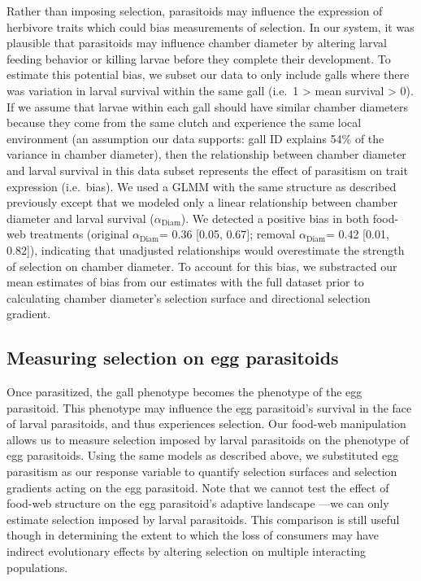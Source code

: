 \documentclass[11pt,]{article}
\begin{document}
Rather than imposing selection, parasitoids may influence the expression
of herbivore traits which could bias measurements of selection. In our
system, it was plausible that parasitoids may influence chamber diameter
by altering larval feeding behavior or killing larvae before they
complete their development. To estimate this potential bias, we subset
our data to only include galls where there was variation in larval
survival within the same gall (i.e.~1 \textgreater{} mean survival
\textgreater{} 0). If we assume that larvae within each gall should have
similar chamber diameters because they come from the same clutch and
experience the same local environment (an assumption our data supports:
gall ID explains 54\% of the variance in chamber diameter), then the
relationship between chamber diameter and larval survival in this data
subset represents the effect of parasitism on trait expression
(i.e.~bias). We used a GLMM with the same structure as described
previously except that we modeled only a linear relationship between
chamber diameter and larval survival (\(\alpha_{\text{Diam}}\)). We
detected a positive bias in both food-web treatments (original
\(\alpha_{\text{Diam}}\)= 0.36 {[}0.05, 0.67{]}; removal
\(\alpha_{\text{Diam}}\)= 0.42 {[}0.01, 0.82{]}), indicating that
unadjusted relationships would overestimate the strength of selection on
chamber diameter. To account for this bias, we substracted our mean
estimates of bias from our estimates with the full dataset prior to
calculating chamber diameter's selection surface and directional
selection gradient.

\subsection{Measuring selection on egg
parasitoids}\label{measuring-selection-on-egg-parasitoids}

Once parasitized, the gall phenotype becomes the phenotype of the egg
parasitoid. This phenotype may influence the egg parasitoid's survival
in the face of larval parasitoids, and thus experiences selection. Our
food-web manipulation allows us to measure selection imposed by larval
parasitoids on the phenotype of egg parasitoids. Using the same models
as described above, we substituted egg parasitism as our response
variable to quantify selection surfaces and selection gradients acting
on the egg parasitoid. Note that we cannot test the effect of food-web
structure on the egg parasitoid's adaptive landscape ---we can only
estimate selection imposed by larval parasitoids. This comparison is
still useful though in determining the extent to which the loss of
consumers may have indirect evolutionary effects by altering selection
on multiple interacting populations.
\end{document}
